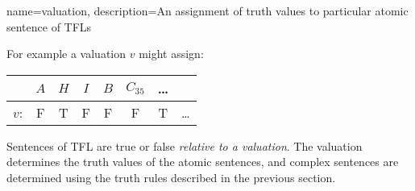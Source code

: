 
{
name=valuation,
description={An assignment of \glspl{truth value} to particular atomic \glspl{sentence of TFL}}
}


For example a valuation $v$ might assign:
\begin{center}
	\begin{tabular}{rccccccc}
	&	$A$&$H$&$I$&$B$&$C_{35}$&\ldots\\\hline
	$v$:&	F & T &F&F&F&T&\ldots
	\end{tabular}
\end{center}

Sentences of TFL are true or false \emph{relative to a valuation}. 
The valuation determines the truth values of the atomic sentences, and complex sentences are determined using the truth rules described in the previous section. 
